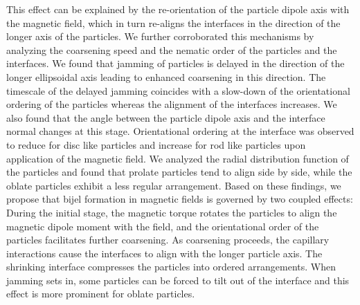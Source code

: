 This effect can
be explained by the re-orientation of the particle dipole axis with the
magnetic field, which in turn re-aligns the interfaces in the direction
of the longer axis of the particles. We further corroborated this
mechanisms by analyzing the coarsening speed and the nematic order of
the particles and the interfaces. We found that jamming of particles is
delayed in the direction of the longer ellipsoidal axis leading to
enhanced coarsening in this direction. The timescale of the delayed
jamming coincides with a slow-down of the orientational ordering of the
particles whereas the alignment of the interfaces increases. We also
found that the angle between the particle dipole axis and the interface
normal changes at this stage. Orientational ordering at the interface was
observed to reduce for disc like particles and increase for rod like
particles upon application of the magnetic field. We analyzed the radial
distribution function of the particles and found that prolate particles
tend to align side by side, while the oblate particles exhibit a less
regular arrangement. Based on these findings, we propose that bijel
formation in magnetic fields is governed by two coupled effects: During
the initial stage, the magnetic torque rotates the particles to align
the magnetic dipole moment with the field, and the orientational order
of the particles facilitates further coarsening. As coarsening proceeds,
the capillary interactions cause the interfaces to align with the longer
particle axis. The shrinking interface compresses the particles into
ordered arrangements. When jamming sets in, some particles can be forced
to tilt out of the interface and this effect is more prominent for
oblate particles.

